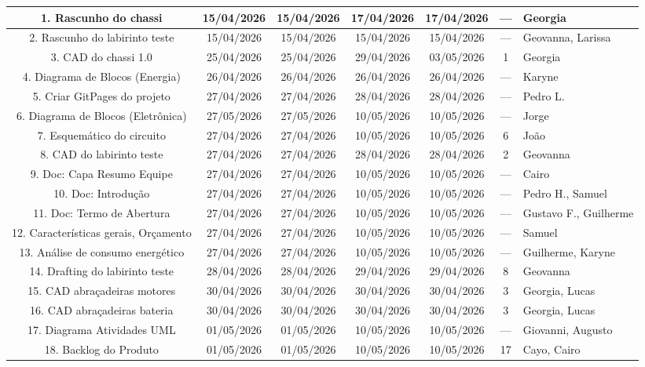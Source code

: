 \begin{landscape}
\begin{center}
\begin{longtable}{|c|c|c|c|c|c|p{3.6cm}|}
1. Rascunho do chassi & 15/04/2026 & 15/04/2026 & 17/04/2026 & 17/04/2026 & --- & Georgia \\ \hline
2. Rascunho do labirinto teste & 15/04/2026 & 15/04/2026 & 15/04/2026 & 15/04/2026 & --- & Geovanna, Larissa \\ \hline
3. CAD do chassi 1.0 & 25/04/2026 & 25/04/2026 & 29/04/2026 & 03/05/2026 & 1 & Georgia\\ \hline
4. Diagrama de Blocos (Energia) & 26/04/2026 & 26/04/2026 & 26/04/2026 & 26/04/2026 & --- & Karyne \\ \hline
5. Criar GitPages do projeto & 27/04/2026 & 27/04/2026 & 28/04/2026 & 28/04/2026 & --- & Pedro L. \\ \hline
6. Diagrama de Blocos (Eletrônica) & 27/05/2026 & 27/05/2026 & 10/05/2026 & 10/05/2026 & --- & Jorge \\ \hline
7. Esquemático do circuito & 27/04/2026 & 27/04/2026 & 10/05/2026 & 10/05/2026 & 6 & João \\ \hline
8. CAD do labirinto teste & 27/04/2026 & 27/04/2026 & 28/04/2026 & 28/04/2026 & 2 & Geovanna \\ \hline
9. Doc: Capa Resumo Equipe & 27/04/2026 & 27/04/2026 & 10/05/2026 & 10/05/2026 & --- & Cairo \\ \hline
10. Doc: Introdução & 27/04/2026 & 27/04/2026 & 10/05/2026 & 10/05/2026 & --- & Pedro H., Samuel \\ \hline
11. Doc: Termo de Abertura & 27/04/2026 & 27/04/2026 & 10/05/2026 & 10/05/2026 & --- & Gustavo F., Guilherme \\ \hline
12. Características gerais, Orçamento & 27/04/2026 & 27/04/2026 & 10/05/2026 & 10/05/2026 & --- & Samuel \\ \hline
13. Análise de consumo energético & 27/04/2026 & 27/04/2026 & 10/05/2026 & 10/05/2026 & --- & Guilherme, Karyne \\ \hline
14. Drafting do labirinto teste & 28/04/2026 & 28/04/2026 & 29/04/2026 & 29/04/2026 & 8 & Geovanna \\ \hline
15. CAD abraçadeiras motores & 30/04/2026 & 30/04/2026 & 30/04/2026 & 30/04/2026 & 3 & Georgia, Lucas \\ \hline
16. CAD abraçadeiras bateria & 30/04/2026 & 30/04/2026 & 30/04/2026 & 30/04/2026 & 3 & Georgia, Lucas \\ \hline
17. Diagrama Atividades UML & 01/05/2026 & 01/05/2026 & 10/05/2026 & 10/05/2026 & --- & Giovanni, Augusto \\ \hline
18. Backlog do Produto & 01/05/2026 & 01/05/2026 & 10/05/2026 & 10/05/2026 & 17 & Cayo, Cairo \\ \hline

\end{longtable}
\end{center}
\end{landscape}
